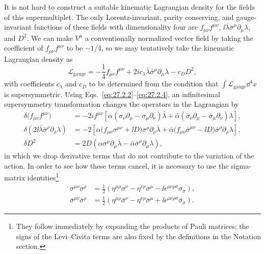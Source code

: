 It is not hard to construct a suitable kinematic Lagrangian density for
the fields of this supermultiplet. The only Lorentz-invariant, parity
conserving, and gauge-invariant functions of these fields with
dimensionality four are \(f_{\mu\nu}f^{\mu\nu}\),
\(\ii\bar\lambda\bar\sigma^\mu\partial_\mu\lambda\), and \(D^2\). We can
make \(V^\mu\) a
conventionally normalized vector field by taking the coefficient of
\(f_{\mu\nu}f^{\mu\nu}\) to be \(-1/4\), so we may tentatively take the
kinematic Lagrangian density as
\[
  \mathcal{L}_{\mathrm{gauge}}
  =-\frac14 f_{\mu\nu}f^{\mu\nu}
  +2ic_\lambda\bar\lambda\bar\sigma^\mu\partial_\mu\lambda
  -c_DD^2,
\]
with coefficients \(c_\lambda\) and \(c_D\) to be determined from the
condition that \(\int\mathcal{L}_{\mathrm{gauge}}\dd^4x\) is supersymmetric.
Using Eqs.~\eqref{eq:27.2.2}--\eqref{eq:27.2.4}, an infinitesimal
supersymmetry transformation changes the operators in the Lagrangian by
\[
  \begin{aligned}
  \delta\bigl(f_{\mu\nu}f^{\mu\nu}\bigr)
  &=-2if^{\mu\nu}\left[
    \alpha(\sigma_\nu\partial_\mu-\sigma_\mu\partial_\nu)\bar\lambda
    +\bar\alpha(\bar\sigma_\nu\partial_\mu
      -\bar\sigma_\mu\partial_\nu)\lambda\right],
  \\
  \delta\!\left(2\ii\bar\lambda\bar\sigma^\rho
      \partial_\rho\lambda\right)
  &=-2\left[
    \alpha\bigl(f_{\mu\nu}\sigma^{\mu\nu}+\ii D\bigr)
      \sigma^\rho\partial_\rho\bar\lambda
    +\bar\alpha\bigl(f_{\mu\nu}\bar\sigma^{\mu\nu}-\ii D\bigr)
      \bar\sigma^\rho\partial_\rho\lambda
  \right],
  \\
  \delta D^2&=2D\left(
    \alpha\sigma^\mu\partial_\mu\bar\lambda
    -\bar\alpha\bar\sigma^\mu\partial_\mu\lambda\right),
  \end{aligned}
\]
in which we drop derivative terms that do not contribute to the variation
of the action. In order to see how these terms cancel, it is necessary to
use the sigma-matrix identities\footnote{They follow immediately by
expanding the products of Pauli matrices; the signs of the
Levi--Civita terms are also fixed by the definitions in the Notation
section.}
\begin{equation}
  \begin{aligned}
  \sigma^{\mu\nu}\sigma^\rho
  &=\frac12\left(
    \eta^{\mu\rho}\sigma^\nu-\eta^{\nu\rho}\sigma^\mu
    -\ii\epsilon^{\mu\nu\rho\sigma}\sigma_\sigma\right),\\
  \bar\sigma^{\mu\nu}\bar\sigma^\rho
  &=\frac12\left(
    \eta^{\mu\rho}\bar\sigma^\nu-\eta^{\nu\rho}\bar\sigma^\mu
    +\ii\epsilon^{\mu\nu\rho\sigma}\bar\sigma_\sigma\right).
  \end{aligned}
  \tag{27.2.5}\label{eq:27.2.5}
\end{equation}
